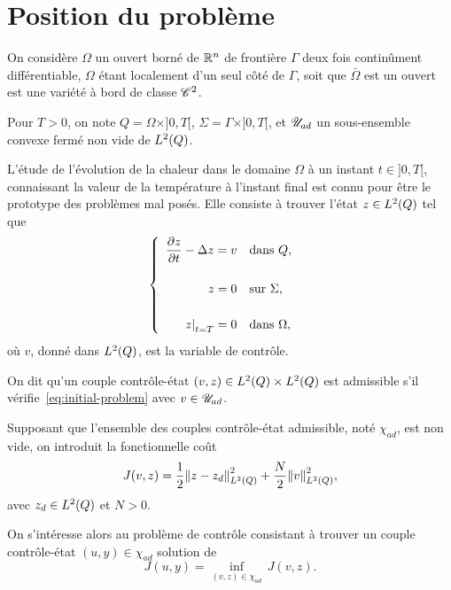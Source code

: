 \section{Position du problème}

On considère $\Omega$ un ouvert borné de ${\mathbb{R}}^{n}$ de frontière
${\Gamma}$ deux fois continûment différentiable, $\Omega$ étant localement
d'un seul côté de $\Gamma$, soit que $\bar{\Omega}$ est un ouvert est une
variété à bord de classe ${\mathscr{C}}^{2}$.

Pour $T > 0$, on note $\displaystyle Q = \Omega\times]0,T[$, $\displaystyle
\Sigma = \Gamma\times ]0,T[$, et $\displaystyle {\mathscr{U}}_{ad}$ un
sous-ensemble convexe fermé non vide de $L^{2}\!\left({Q}\right)$.

L'étude de l'évolution de la chaleur dans le domaine $\Omega$ à un instant
$t\in ]0,T[$, connaissant la valeur de la température à l'instant final est
connu pour être le prototype des problèmes mal posés. Elle consiste à
trouver l'état $z\in L^{2}\!\left({Q}\right)$ tel que
\begin{equation}\label{eq:initial-problem}
    \begin{cases}\displaystyle
        \begin{array}{rl}
            \dfrac{\partial{}z}{\partial{}t} - \Delta z = v & \text{dans}\ Q,\\
            \\
            z = 0 & \text{sur}\ \Sigma,\\
            \\
            {\left.{z}\right|}_{t = T} = 0 & \text{dans}\ \Omega,
        \end{array}
    \end{cases}
\end{equation}
où $v$, donné dans $L^{2}\!\left({Q}\right)$, est la variable de contrôle.

On dit qu'un couple contrôle-état $(v,z)\in L^{2}\!\left({Q}\right)\times L^{2}\!\left({Q}\right)$
est admissible s'il vérifie~\eqref{eq:initial-problem} avec $v\in
{\mathscr{U}}_{ad}$.

Supposant que l'ensemble des couples contrôle-état admissible, noté
${\chi}_{ad}$, est non vide, on introduit la fonctionnelle coût
\begin{equation}\label{eq:initial-cost-function}
    J(v,z) = \dfrac{1}{2}{\left\|{z - z_{d} }\right\|}_{L^{2}\left({Q}\right)}^{2} + \dfrac{N}{2}{\left\|{v }\right\|}_{L^{2}\left({Q}\right)}^{2},
\end{equation}
avec $z_{d}\in L^{2}\!\left({Q}\right)$ et $N > 0$.

On s'intéresse alors au problème de contrôle consistant à trouver un couple
contrôle-état $\displaystyle (u,y)\in {\chi}_{ad}$ solution de
\begin{equation}\label{eq:initial-control-problem}
    J(u,y) = \inf_{(v,z)\in {\chi}_{ad}}\,J(v,z).
\end{equation}

